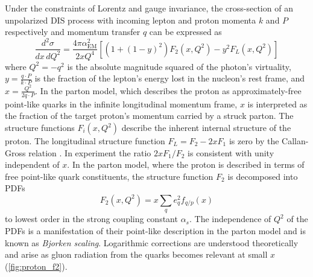 Under the constraints of Lorentz and gauge invariance, the cross-section of an unpolarized \ac{DIS} process with incoming lepton and proton momenta $k$ and $P$ respectively and momentum transfer $q$ can be expressed as \cite{Tanabashi:2018oca}
\begin{equation}
  \frac{d^2 \sigma}{dx \, dQ^2} = \frac{4\pi\alpha^2_\textrm{EM}}{2xQ^4}\left[ \left(1+(1-y)^2\right) F_2\left(x, Q^2\right) - y^2 F_L \left(x, Q^2\right) \right]
  \label{eq:dis}
\end{equation}
where $Q^2 = -q^2$ is the absolute magnitude squared of the photon's virtuality, $y = \frac{q \cdot P}{k \cdot P}$ is the fraction of the lepton's energy lost in the nucleon's rest frame, and $x = \frac{Q^2}{2q \cdot P}$.
In the parton model, which describes the proton as approximately-free point-like quarks in the infinite longitudinal momentum frame, $x$ is interpreted as the fraction of the target proton's momentum carried by a struck parton.
The structure functions $F_i(x, Q^2)$ describe the inherent internal structure of the proton.
The longitudinal structure function $F_L = F_2 - 2xF_1$ is zero by the Callan-Gross relation \cite{Callan:1969uq}.
In experiment the ratio $2xF_1 / F_2$ is consistent with unity independent of $x$.
In the parton model, where the proton is described in terms of free point-like quark constituents, the structure function $F_2$ is decomposed into \acp{PDF}
\begin{equation}
F_2 \left(x, Q^2\right) = x \sum_q e_q^2 f_{q/p}(x)
\end{equation}
to lowest order in the strong coupling constant $\alpha_s$.
The independence of $Q^2$ of the \acp{PDF} is a manifestation of their point-like description in the parton model and is known as \emph{Bjorken scaling}.
Logarithmic corrections are understood theoretically and arise as gluon radiation from the quarks becomes relevant at small $x$ (\cref{fig:proton_f2}).

